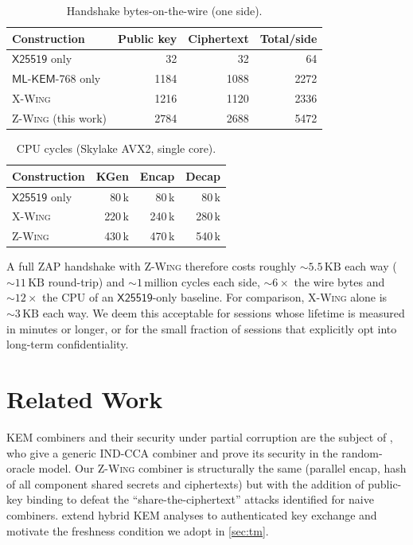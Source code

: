 \documentclass[11pt,a4paper]{article}
\theoremstyle{definition}
\theoremstyle{remark}
\newcommand{\xwing}{\textsc{X-Wing}}
\newcommand{\zwing}{\textsc{Z-Wing}}
\newcommand{\zap}{\textsc{ZAP}}
\newcommand{\mlkem}{\ensuremath{\mathsf{ML\text{-}KEM}}}
\newcommand{\xtf}{\ensuremath{\mathsf{X25519}}}
\begin{document}
\begin{table}[h]
\centering
\caption{Handshake bytes-on-the-wire (one side).}\label{tab:wire}
\begin{tabular}{lrrr}
\toprule
Construction & Public key & Ciphertext & Total/side \\
\midrule
\xtf{} only            & 32   & 32   & 64 \\
\mlkem{}-768 only       & 1184 & 1088 & 2272 \\
\xwing{}                & 1216 & 1120 & 2336 \\
\zwing{} (this work)    & 2784 & 2688 & 5472 \\
\bottomrule
\end{tabular}
\end{table}

\begin{table}[h]
\centering
\caption{CPU cycles (Skylake AVX2, single core).}\label{tab:cycles}
\begin{tabular}{lrrr}
\toprule
Construction & KGen & Encap & Decap \\
\midrule
\xtf{} only          &   80\,k &   80\,k &   80\,k \\
\xwing{}             &  220\,k &  240\,k &  280\,k \\
\zwing{}             &  430\,k &  470\,k &  540\,k \\
\bottomrule
\end{tabular}
\end{table}

A full \zap{} handshake with \zwing{} therefore costs roughly
$\sim 5.5\,\text{KB}$ each way ($\sim 11\,\text{KB}$ round-trip) and
$\sim 1\,\text{million cycles}$ each side, $\sim 6\times$ the wire bytes
and $\sim 12\times$ the CPU of an \xtf{}-only baseline. For comparison,
\xwing{} alone is $\sim 3\,\text{KB}$ each way. We deem this acceptable
for sessions whose lifetime is measured in minutes or longer, or for the
small fraction of sessions that explicitly opt into long-term confidentiality.

\section{Related Work}\label{sec:related}

KEM combiners and their security under partial corruption are the subject of
\cite{giacon2018kem}, who give a generic IND-CCA combiner and prove its
security in the random-oracle model. Our \zwing{} combiner is structurally
the same (parallel encap, hash of all component shared secrets and ciphertexts)
but with the addition of public-key binding to defeat the
``share-the-ciphertext'' attacks identified for naive combiners.
\cite{bindel2019hybrid} extend hybrid KEM analyses to authenticated key
exchange and motivate the freshness condition we adopt in
\cref{sec:tm}.
\end{document}
